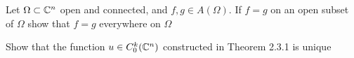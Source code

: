 \documentclass[../main.tex]{subfiles}
\begin{document}
\begin{problem}
Let $\Omega \subset \Bbb C^n$ open and connected, and $f,g \in A(\Omega)$. If $f=g$ on an open subset of $\Omega$ show that $f=g$ everywhere on $\Omega$
\end{problem}

\begin{problem}
Show that the function $u \in C^k_0(\Bbb C^n)$ constructed in Theorem 2.3.1 is unique
\end{problem}
\end{document}
